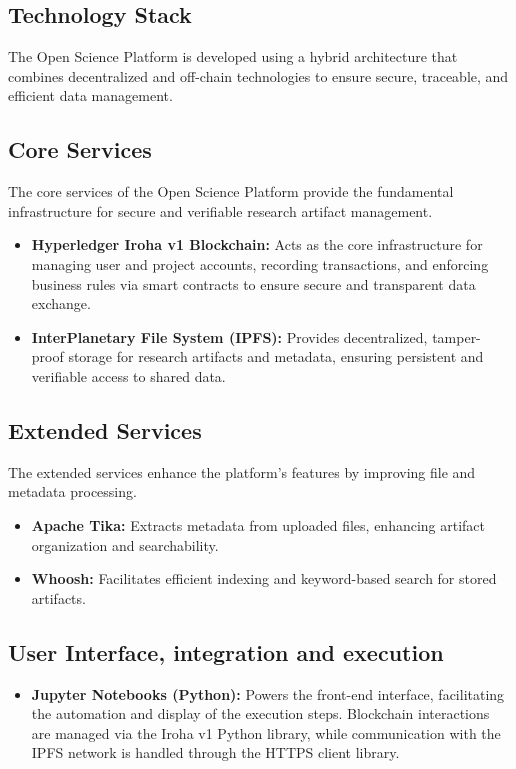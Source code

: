 \documentclass{article}
\begin{document}
\subsection{Technology Stack}
The Open Science Platform is developed using a hybrid architecture that combines decentralized and off-chain technologies to ensure secure, traceable, and efficient data management.

\subsection{Core Services}

The core services of the Open Science Platform provide the fundamental infrastructure for secure and verifiable research artifact management.

\begin{itemize}
      \item \textbf{Hyperledger Iroha v1 Blockchain:} Acts as the core infrastructure for managing user and project accounts, recording transactions, and enforcing business rules via smart contracts to ensure secure and transparent data exchange.
      \item \textbf{InterPlanetary File System (IPFS):} Provides decentralized, tamper-proof storage for research artifacts and metadata, ensuring persistent and verifiable access to shared data.
\end{itemize}

\subsection{Extended Services}

The extended services enhance the platform's features by improving file and metadata processing.

\begin{itemize}
      \item \textbf{Apache Tika:} Extracts metadata from uploaded files, enhancing artifact organization and searchability.
      \item \textbf{Whoosh:} Facilitates efficient indexing and keyword-based search for stored artifacts.
\end{itemize}


\subsection{User Interface, integration and execution}

\begin{itemize}
      \item \textbf{Jupyter Notebooks (Python):} Powers the front-end interface, facilitating the automation and display of the execution steps. Blockchain interactions are managed via the Iroha v1 Python library, while communication with the IPFS network is handled through the HTTPS client library.
\end{itemize}
\end{document}
